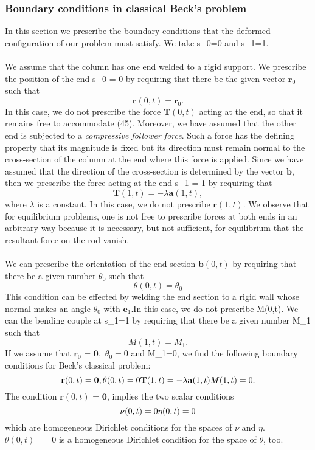 
\subsubsection{Boundary conditions in classical Beck's problem}
In this section we prescribe the boundary conditions that the deformed configuration of our problem must satisfy. We take s_0=0 and s_1=1.\\\\
We assume that the column has one end welded to a rigid support. We prescribe the position of the end s_0 = 0 by requiring that there be the given vector $\mathbf{r}_0$ such that
\[ \mathbf{r}(0,t) = \mathbf{r}_0.\]
In this case, we do not prescribe the force $\mathbf{T}(0,t)$ acting at the end, so that it remains free to accommodate (45). Moreover, we have assumed that the other end is subjected to a \emph{compressive follower force}. Such a force has the defining property that its magnitude is fixed but its direction must remain normal to the cross-section of the column at the end where this force is applied. Since we have assumed that the direction of the cross-section is determined by the vector $\mathbf{b}$, then we prescribe the force acting at the end s_1 = 1 by requiring that 
\[ \mathbf{T}(1,t) = -\lambda \mathbf{a}(1,t), \]
where $\lambda$ is a constant. In this case, we do not prescribe $\mathbf{r}(1,t).$ We observe that for equilibrium problems, one is not free to prescribe forces at both ends in an arbitrary way because it is necessary, but not sufficient, for equilibrium that the resultant force on the rod vanish.
\\\\
We can prescribe the orientation of the end section $\mathbf{b}(0,t)$ by requiring that there be a given number $\theta_0$ such that
\[
\theta(0,t)=\theta_0
\]
This condition can be effected by welding the end section to a rigid wall whose normal makes an angle $\theta_0$ with $\mathbf{e}_1$.In this case, we do not prescribe M(0,t).
We can the bending couple at s_1=1 by requiring that there be a given number M_1 such that
\[ M(1,t) = M_1.\]
If we assume that $\mathbf{r}_0$ = $\mathbf{0},$ $\theta_0=0$ and M_1=0, we find the following boundary conditions for Beck's classical problem:
\[ 
\mathbf{r}(0,t) = \mathbf{0},\\
\theta(0,t) = 0\\
\mathbf{T}(1,t) = -\lambda \mathbf{a}(1,t)\\
M(1,t) = 0.
\]
The condition $\mathbf{r}(0,t)$ = $\mathbf{0}$, implies the two scalar conditions
\[
\nu(0,t)= 0\\
\eta(0,t)= 0
\]
which are homogeneous Dirichlet conditions for the spaces of $\nu$ and $\eta$. $\theta(0,t)\,\,=\,\,0$ is a homogeneous Dirichlet condition for the space of $\theta$, too.
